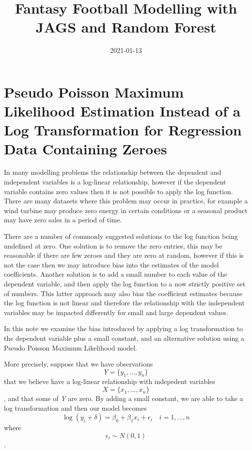 \documentclass[
]{article}
\title{Fantasy Football Modelling with JAGS and Random Forest}
\author{}
\date{\vspace{-2.5em}2021-01-13}
\begin{document}
\maketitle

\hypertarget{pseudo-poisson-maximum-likelihood-estimation-instead-of-a-log-transformation-for-regression-data-containing-zeroes}{%
\section{Pseudo Poisson Maximum Likelihood Estimation Instead of a Log
Transformation for Regression Data Containing
Zeroes}\label{pseudo-poisson-maximum-likelihood-estimation-instead-of-a-log-transformation-for-regression-data-containing-zeroes}}

In many modelling problems the relationship between the dependent and
independent variables is a log-linear relationship, however if the
dependent variable contains zero values then it is not possible to apply
the log function. There are many datasets where this problem may occur
in practice, for example a wind turbine may produce zero energy in
certain conditions or a seasonal product may have zero sales in a period
of time.

There are a number of commonly suggested solutions to the log function
being undefined at zero. One solution is to remove the zero entries,
this may be reasonable if there are few zeroes and they are zero at
random, however if this is not the case then we may introduce bias into
the estimates of the model coefficients. Another solution is to add a
small number to each value of the dependent variable, and then apply the
log function to a now strictly positive set of numbers. This latter
approach may also bias the coefficient estimates because the log
function is not linear and therefore the relationship with the
independent variables may be impacted differently for small and large
dependent values.

In this note we examine the bias introduced by applying a log
transformation to the dependent variable plus a small constant, and an
alternative solution using a Pseudo Poisson Maximum Likelihood model.

More precisely, suppose that we have observations
\[Y = \{y_1, \ldots, y_n \}\] that we believe have a log-linear
relationship with indepedent variables \[X = \{ x_1, \ldots, x_n \}\],
and that some of \emph{Y} are zero. By adding a small constant, we are
able to take a log transformation and then our model becomes
\[  \log \left( y_i + \delta \right) = \beta_0 + \beta_1 x_i + \epsilon_i \quad i = 1, \ldots, n  \]
where \[\epsilon_i \sim N(0, 1)\].
\end{document}
